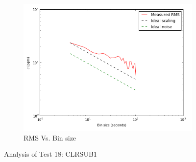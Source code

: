 \documentclass{aastex6}
\begin{document}
\begin{figure}[H]
    \begin{subfigure}{3}
        \includegraphics[scale=0.6]{rms_test18}
        \caption{RMS Vs. Bin size}
    \end{subfigure}
    \caption{Analysis of Test 18: CLRSUB1}
\end{figure}
\end{document}
